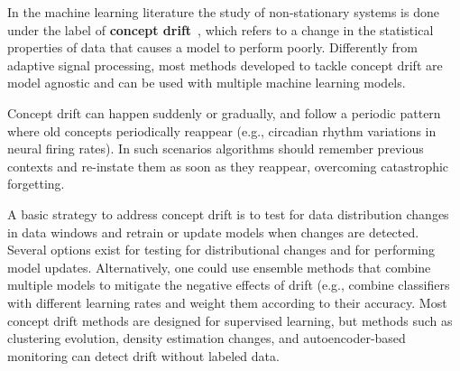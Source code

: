 
In the machine learning literature the study of non-stationary systems is done
under the label of \textbf{concept drift}~\citep{}, which refers to a change in
the statistical properties of data that causes a model to perform poorly.
%
Differently from adaptive signal processing, most methods developed to tackle
concept drift are model agnostic and can be used with multiple machine learning
models.

Concept drift can happen suddenly or gradually, and follow a periodic pattern
where old concepts periodically reappear (e.g., circadian rhythm variations in
neural firing rates). In such scenarios algorithms should remember previous
contexts and re-instate them as soon as they reappear, overcoming catastrophic
forgetting.

A basic strategy to address concept drift is to test for data distribution
changes in data windows and retrain or update models when changes are detected.
Several options exist for testing for distributional changes and for performing
model updates.
%
Alternatively, one could use ensemble methods that combine multiple models to
mitigate the negative effects of drift (e.g., combine classifiers with
different learning rates and weight them according to their accuracy.
%
Most concept drift methods are designed for supervised learning, but methods
such as clustering evolution, density estimation changes, and autoencoder-based
monitoring can detect drift without labeled data.

